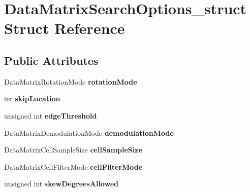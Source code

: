 \hypertarget{structDataMatrixSearchOptions__struct}{
\section{DataMatrixSearchOptions\_\-struct Struct Reference}
\label{structDataMatrixSearchOptions__struct}
}
\subsection*{Public Attributes}
\begin{DoxyCompactItemize}
\item 
\hypertarget{structDataMatrixSearchOptions__struct_a49f7165b87b3466564152ebcdbc84b78}{
DataMatrixRotationMode {\bfseries rotationMode}}
\label{structDataMatrixSearchOptions__struct_a49f7165b87b3466564152ebcdbc84b78}

\item 
\hypertarget{structDataMatrixSearchOptions__struct_abec5b5f12b525e9bd7f35256123e5f8d}{
int {\bfseries skipLocation}}
\label{structDataMatrixSearchOptions__struct_abec5b5f12b525e9bd7f35256123e5f8d}

\item 
\hypertarget{structDataMatrixSearchOptions__struct_aa242e47abd086d71ac3f51d7d39723f6}{
unsigned int {\bfseries edgeThreshold}}
\label{structDataMatrixSearchOptions__struct_aa242e47abd086d71ac3f51d7d39723f6}

\item 
\hypertarget{structDataMatrixSearchOptions__struct_a3ea3aa3a6229d0d60ce6d474c67ca7e3}{
DataMatrixDemodulationMode {\bfseries demodulationMode}}
\label{structDataMatrixSearchOptions__struct_a3ea3aa3a6229d0d60ce6d474c67ca7e3}

\item 
\hypertarget{structDataMatrixSearchOptions__struct_a35947441697d09b929ac261e410c16e1}{
DataMatrixCellSampleSize {\bfseries cellSampleSize}}
\label{structDataMatrixSearchOptions__struct_a35947441697d09b929ac261e410c16e1}

\item 
\hypertarget{structDataMatrixSearchOptions__struct_adb0891296c12476b121b77ef26904511}{
DataMatrixCellFilterMode {\bfseries cellFilterMode}}
\label{structDataMatrixSearchOptions__struct_adb0891296c12476b121b77ef26904511}

\item 
\hypertarget{structDataMatrixSearchOptions__struct_a14bf0dbe29aec9cf8d87705d831884b3}{
unsigned int {\bfseries skewDegreesAllowed}}
\label{structDataMatrixSearchOptions__struct_a14bf0dbe29aec9cf8d87705d831884b3}


\end{DoxyCompactItemize}
